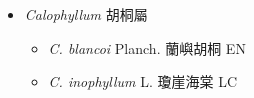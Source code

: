 
  \begin{itemize}
 \item[] \textit{Calophyllum} 胡桐屬
                                
  \begin{itemize}
        \item[] \textit{C. blancoi} Planch.  蘭嶼胡桐   EN
        \item[] \textit{C. inophyllum} L.  瓊崖海棠   LC
  \end{itemize}
  \end{itemize}
